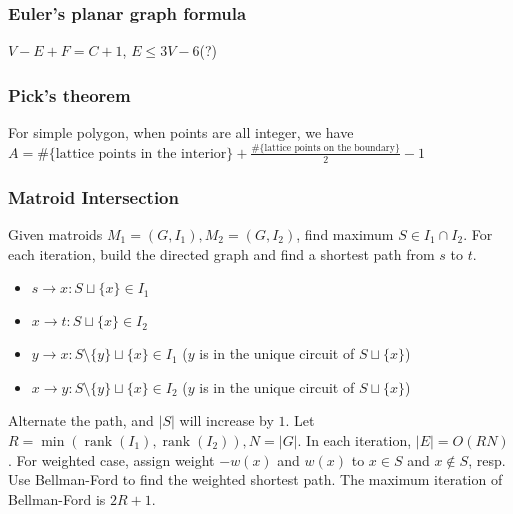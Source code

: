 
\subsubsection{Euler's planar graph formula}
$V-E+F=C+1$, $E\leq 3V-6$(?)

\subsubsection{Pick's theorem}
For simple polygon, when points are all integer, we have $A=\text{\#\{lattice points in the interior\}} + \frac{\text{\#\{lattice points on the boundary\}}}{2} - 1$


\subsubsection{Matroid Intersection}
Given matroids \(M_1=(G,I_1),M_2=(G,I_2)\), find maximum \(S\in I_1\cap I_2\).
For each iteration, build the directed graph and find a shortest path from \(s\) to \(t\).
\begin{itemize}
    \item \(s \to x: S \sqcup \{x\} \in I_1\)
    \item \(x \to t: S \sqcup \{x\} \in I_2\)
    \item \(y \to x: S \setminus \{y\} \sqcup \{x\} \in I_1\) (\(y\) is in the unique circuit of \(S \sqcup \{x\}\))
    \item \(x \to y: S \setminus \{y\} \sqcup \{x\} \in I_2\) (\(y\) is in the unique circuit of \(S \sqcup \{x\}\))
\end{itemize}
Alternate the path, and \(|S|\) will increase by \(1\).
Let \(R = \min(\operatorname{rank}(I_1), \operatorname{rank}(I_2)), N = |G|\).
In each iteration, \(|E| = O(RN)\).
For weighted case, assign weight \(-w(x)\) and \(w(x)\) to \(x\in S\) and \(x\notin S\), resp.
Use Bellman-Ford to find the weighted shortest path.
The maximum iteration of Bellman-Ford is \(2R+1\).
